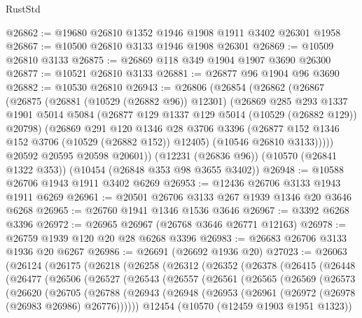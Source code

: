 \begin{lexlean}{RustStd}
\begin{coremodule}
@26862 := @19680 @26810 @1352 @1946 @1908 @1911 @3402 @26301 @1958
@26867 := @10500 @26810 @3133 @1946 @1908 @26301
@26869 := @10509 @26810 @3133
@26875 := @26869 @118 @349 @1904 @1907 @3690 @26300
@26877 := @10521 @26810 @3133
@26881 := @26877 @96 @1904 @96 @3690
@26882 := @10530 @26810
@26943 := @26806
    (@26854
      (@26862
        (@26867
          (@26875
            (@26881 (@10529 (@26882 @96)) @12301)
            (@26869
              @285
              @293
              @1337
              @1901
              @5014
              @5084
              (@26877 @129 @1337 @129 @5014 (@10529 (@26882 @129)) @20798)
              (@26869
                @291
                @120
                @1346
                @28
                @3706
                @3396
                (@26877 @152 @1346 @152 @3706 (@10529 (@26882 @152)) @12405)
                (@10546 @26810 @3133)))))
        @20592
        @20595
        @20598
        @20601))
    (@12231 (@26836 @96))
    (@10570 (@26841 @1322 @353))
    (@10454 (@26848 @353 @98 @3655 @3402))
@26948 := @10588 @26706 @1943 @1911 @3402 @6269
@26953 := @12436 @26706 @3133 @1943 @1911 @6269
@26961 := @20501 @26706 @3133 @267 @1939 @1346 @20 @3646 @6268
@26965 := @26760 @1941 @1346 @1536 @3646
@26967 := @3392 @6268 @3396
@26972 := @26965 @26967 (@26768 @3646 @26771 @12163)
@26978 := @26759 @1939 @120 @20 @28 @6268 @3396
@26983 := @26683 @26706 @3133 @1936 @20 @6267
@26986 := @26691 (@26692 @1936 @20)
@27023 := @26063
    (@26124
      (@26175
        (@26218
          (@26258
            (@26312
              (@26352
                (@26378
                  (@26415
                    (@26448
                      (@26477
                        (@26506
                          (@26527
                            (@26543
                              (@26557
                                (@26561
                                  (@26565
                                    (@26569
                                      (@26573
                                        (@26620
                                          (@26705
                                            (@26788
                                              (@26943
                                                (@26948
                                                  (@26953
                                                    (@26961
                                                      (@26972 (@26978 (@26983 @26986) @26776))))))
                                              @12454
                                              (@10570 (@12459 @1903 @1951 @1323))

\end{coremodule}
\end{lexlean}
